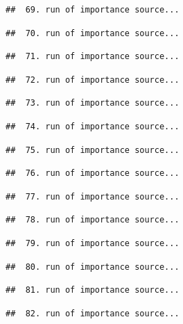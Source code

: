 \documentclass[
]{article}
\begin{document}
\begin{verbatim}
##  69. run of importance source...
\end{verbatim}

\begin{verbatim}
##  70. run of importance source...
\end{verbatim}

\begin{verbatim}
##  71. run of importance source...
\end{verbatim}

\begin{verbatim}
##  72. run of importance source...
\end{verbatim}

\begin{verbatim}
##  73. run of importance source...
\end{verbatim}

\begin{verbatim}
##  74. run of importance source...
\end{verbatim}

\begin{verbatim}
##  75. run of importance source...
\end{verbatim}

\begin{verbatim}
##  76. run of importance source...
\end{verbatim}

\begin{verbatim}
##  77. run of importance source...
\end{verbatim}

\begin{verbatim}
##  78. run of importance source...
\end{verbatim}

\begin{verbatim}
##  79. run of importance source...
\end{verbatim}

\begin{verbatim}
##  80. run of importance source...
\end{verbatim}

\begin{verbatim}
##  81. run of importance source...
\end{verbatim}

\begin{verbatim}
##  82. run of importance source...
\end{verbatim}
\end{document}
